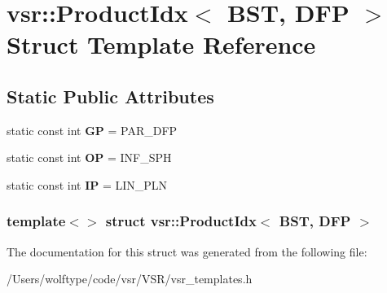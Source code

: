 \hypertarget{structvsr_1_1_product_idx_3_01_b_s_t_00_01_d_f_p_01_4}{\section{vsr\-:\-:Product\-Idx$<$ B\-S\-T, D\-F\-P $>$ Struct Template Reference}
\label{structvsr_1_1_product_idx_3_01_b_s_t_00_01_d_f_p_01_4}
}
\subsection*{Static Public Attributes}
\begin{DoxyCompactItemize}
\item 
\hypertarget{structvsr_1_1_product_idx_3_01_b_s_t_00_01_d_f_p_01_4_a2acc308fa38b96ce57080a801b0d2d38}{static const int {\bfseries G\-P} = P\-A\-R\-\_\-\-D\-F\-P}\label{structvsr_1_1_product_idx_3_01_b_s_t_00_01_d_f_p_01_4_a2acc308fa38b96ce57080a801b0d2d38}

\item 
\hypertarget{structvsr_1_1_product_idx_3_01_b_s_t_00_01_d_f_p_01_4_aa93f90ef3c444ff71edc90238be4a484}{static const int {\bfseries O\-P} = I\-N\-F\-\_\-\-S\-P\-H}\label{structvsr_1_1_product_idx_3_01_b_s_t_00_01_d_f_p_01_4_aa93f90ef3c444ff71edc90238be4a484}

\item 
\hypertarget{structvsr_1_1_product_idx_3_01_b_s_t_00_01_d_f_p_01_4_a537f05cd0d2e447c27aa481875d0429c}{static const int {\bfseries I\-P} = L\-I\-N\-\_\-\-P\-L\-N}\label{structvsr_1_1_product_idx_3_01_b_s_t_00_01_d_f_p_01_4_a537f05cd0d2e447c27aa481875d0429c}

\end{DoxyCompactItemize}
\subsubsection*{template$<$$>$ struct vsr\-::\-Product\-Idx$<$ B\-S\-T, D\-F\-P $>$}



The documentation for this struct was generated from the following file\-:\begin{DoxyCompactItemize}
\item 
/\-Users/wolftype/code/vsr/\-V\-S\-R/vsr\-\_\-templates.\-h\end{DoxyCompactItemize}
